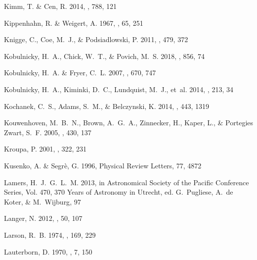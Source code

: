 \documentclass{aa}
\begin{document}
\begin{thebibliography}{242}
{Kimm}, T. \& {Cen}, R. 2014, \apj, 788, 121

{Kippenhahn}, R. \& {Weigert}, A. 1967, \zap, 65, 251

{Knigge}, C., {Coe}, M.~J., \& {Podsiadlowski}, P. 2011, \nat, 479, 372

{Kobulnicky}, H.~A., {Chick}, W.~T., \& {Povich}, M.~S. 2018, \apj, 856, 74

{Kobulnicky}, H.~A. \& {Fryer}, C.~L. 2007, \apj, 670, 747

{Kobulnicky}, H.~A., {Kiminki}, D.~C., {Lundquist}, M.~J., {et~al.} 2014,
  \apjs, 213, 34

{Kochanek}, C.~S., {Adams}, S.~M., \& {Belczynski}, K. 2014, \mnras, 443, 1319

{Kouwenhoven}, M.~B.~N., {Brown}, A.~G.~A., {Zinnecker}, H., {Kaper}, L., \&
  {Portegies Zwart}, S.~F. 2005, \aap, 430, 137

{Kroupa}, P. 2001, \mnras, 322, 231

{Kusenko}, A. \& {Segr{\`e}}, G. 1996, Physical Review Letters, 77, 4872

{Lamers}, H.~J.~G.~L.~M. 2013, in Astronomical Society of the Pacific
  Conference Series, Vol. 470, 370 Years of Astronomy in Utrecht, ed.
  G.~{Pugliese}, A.~{de Koter}, \& M.~{Wijburg}, 97

{Langer}, N. 2012, \araa, 50, 107

{Larson}, R.~B. 1974, \mnras, 169, 229

{Lauterborn}, D. 1970, \aap, 7, 150


\end{thebibliography}
\end{document}
